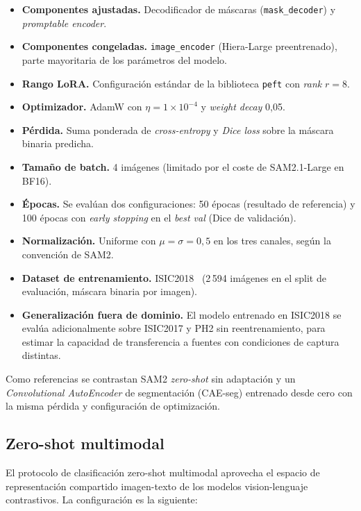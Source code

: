 \begin{itemize}
\item \textbf{Componentes ajustadas.} Decodificador de máscaras
(\texttt{mask\_decoder}) y \emph{promptable encoder}.
\item \textbf{Componentes congeladas.} \texttt{image\_encoder}
(Hiera-Large preentrenado), parte mayoritaria de los parámetros del
modelo.
\item \textbf{Rango LoRA.} Configuración estándar de la biblioteca
\texttt{peft} con \emph{rank} $r=8$.
\item \textbf{Optimizador.} AdamW con $\eta=1\times10^{-4}$ y
\emph{weight decay} 0{,}05.
\item \textbf{Pérdida.} Suma ponderada de \emph{cross-entropy} y
\emph{Dice loss} sobre la máscara binaria predicha.
\item \textbf{Tamaño de batch.} 4 imágenes (limitado por el coste
de SAM2.1-Large en BF16).
\item \textbf{Épocas.} Se evalúan dos configuraciones: 50 épocas
(resultado de referencia) y 100 épocas con \emph{early stopping} en
el \emph{best val} (Dice de validación).
\item \textbf{Normalización.} Uniforme con
$\mu=\sigma=0{,}5$ en los tres canales, según la convención de
SAM2.
\item \textbf{Dataset de entrenamiento.}
ISIC2018~\cite{isic2018} (2\,594 imágenes en el split de
evaluación, máscara binaria por imagen).
\item \textbf{Generalización fuera de dominio.} El modelo entrenado
en ISIC2018 se evalúa adicionalmente sobre ISIC2017 y PH2 sin
reentrenamiento, para estimar la capacidad de transferencia a
fuentes con condiciones de captura distintas.
\end{itemize}

Como referencias se contrastan SAM2 \emph{zero-shot} sin
adaptación y un \emph{Convolutional AutoEncoder} de segmentación
(CAE-seg) entrenado desde cero con la misma pérdida y
configuración de optimización.

\subsection{Zero-shot multimodal}
\label{sec:zs-protocol}

El protocolo de clasificación zero-shot multimodal aprovecha el
espacio de representación compartido imagen-texto de los modelos
vision-lenguaje contrastivos. La configuración es la siguiente:

